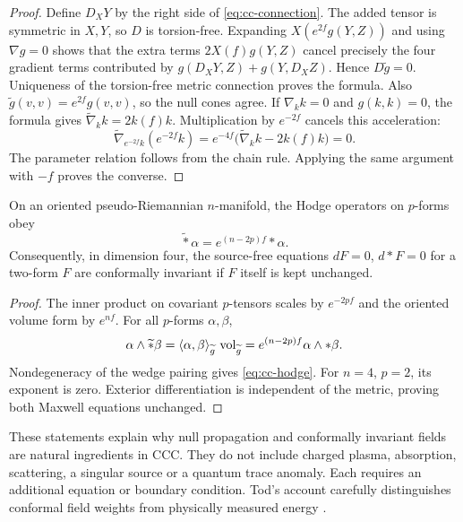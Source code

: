 \begin{proof}
Define $D_XY$ by the right side of \eqref{eq:cc-connection}. The added tensor
is symmetric in $X,Y$, so $D$ is torsion-free. Expanding
$X(e^{2f}g(Y,Z))$ and using $\nabla g=0$ shows that the extra terms
$2X(f)g(Y,Z)$ cancel precisely the four gradient terms contributed by
$g(D_XY,Z)+g(Y,D_XZ)$. Hence $D\widetilde g=0$. Uniqueness of the
torsion-free metric connection proves the formula. Also
$\widetilde g(v,v)=e^{2f}g(v,v)$, so the null cones agree. If
$\nabla_k k=0$ and $g(k,k)=0$, the formula gives
$\widetilde\nabla_k k=2k(f)k$. Multiplication by $e^{-2f}$ cancels this
acceleration:
\[
 \widetilde\nabla_{e^{-2f}k}(e^{-2f}k)
 =e^{-4f}\bigl(\widetilde\nabla_k k-2k(f)k\bigr)=0.
\]
The parameter relation follows from the chain rule. Applying the same
argument with $-f$ proves the converse.
\end{proof}

\begin{proposition}
\label{prop:cc-maxwell}
On an oriented pseudo-Riemannian $n$-manifold, the Hodge operators on
$p$-forms obey
\begin{equation}
 \widetilde *\alpha=e^{(n-2p)f}*\alpha.
 \label{eq:cc-hodge}
\end{equation}
Consequently, in dimension four, the source-free equations
$dF=0$, $d*F=0$ for a two-form $F$ are conformally invariant if $F$ itself
is kept unchanged.
\end{proposition}

\begin{proof}
The inner product on covariant $p$-tensors scales by $e^{-2pf}$ and the
oriented volume form by $e^{nf}$. For all $p$-forms $\alpha,\beta$,
\[
 \alpha\wedge\widetilde *\beta
 =\langle\alpha,\beta\rangle_{\widetilde g}\,\operatorname{vol}_{\widetilde g}
 =e^{(n-2p)f}\alpha\wedge *\beta.
\]
Nondegeneracy of the wedge pairing gives \eqref{eq:cc-hodge}. For $n=4$,
$p=2$, its exponent is zero. Exterior differentiation is independent of
the metric, proving both Maxwell equations unchanged.
\end{proof}

These statements explain why null propagation and conformally invariant
fields are natural ingredients in CCC. They do not include charged plasma,
absorption, scattering, a singular source or a quantum trace anomaly. Each
requires an additional equation or boundary condition. Tod's account
carefully distinguishes conformal field weights from physically measured
energy \citep[Secs.~1.2, 1.3.1 and 3.6]{CCTod2021}.

